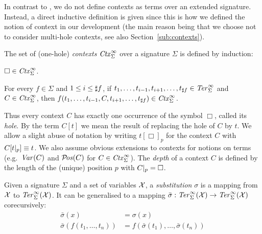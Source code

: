 In contrast to \cite{terese-03}, we do not define contexts as terms over an
extended signature. Instead, a direct inductive definition is given since this
is how we defined the notion of context in our \Coq development (the main
reason being that we choose not to consider multi-hole contexts, see
also Section~\ref{sub:contexts}).

\begin{definition}%
The set of (one-hole) \emph{contexts} $\mathit{Ctx}_\Sigma^\infty$ over a signature
$\Sigma$ is defined by induction:
\begin{compactenum}
  \item
    $\Box \in \mathit{Ctx}_\Sigma^\infty$.
  \item
    For every $f \in \Sigma$ and $1 \le i \le \sharp f$, if $t_1,
    \ldots, t_{i - 1}, t_{i + 1}, \ldots, t_{\sharp f} \in \mathit{Ter}_\Sigma^\infty$ and
    $C \in \mathit{Ctx}_\Sigma^\infty$, then $f(t_1, \ldots, t_{i - 1}, C, t_{i + 1},
    \ldots, t_{\sharp f}) \in \mathit{Ctx}_\Sigma^\infty$.
\end{compactenum}
\end{definition}

Thus every context $C$ has exactly one occurrence of the symbol $\Box$, called
its \emph{hole}. By the term $C[t]$ we mean the result of replacing the hole
of $C$ by $t$. We allow a slight abuse of notation by writing
$t[\Box]_p$ for the context $C$ with $C[t |_{p}] \equiv t$. We
also assume obvious extensions to contexts for notions on terms
(e.g.\ $\mathit{Var}(C)$ and $\mathcal{P}\!\mathit{os}(C)$ for $C \in \mathit{Ctx}_\Sigma^\infty$).
The \emph{depth} of a context $C$ is defined by the length of the
(unique) position $p$ with $C |_{p} = \Box$.


\begin{definition}%
Given a signature $\Sigma$ and a set of variables $\mathcal{X}$, a
\emph{substitution} $\sigma$ is a mapping from $\mathcal{X}$ to $\mathit{Ter}_\Sigma^\infty(\mathcal{X})$. It
can be generalised to a mapping $\bar{\sigma} : \mathit{Ter}_\Sigma^\infty(\mathcal{X}) \rightarrow
\mathit{Ter}_\Sigma^\infty(\mathcal{X})$ corecursively:
\begin{align*}
  \bar{\sigma}(x) &= \sigma(x)\\
  \bar{\sigma}(f(t_1, \ldots, t_n)) &= f(\bar{\sigma}(t_1), \ldots,
  \bar{\sigma}(t_n))
\end{align*}
\end{definition}

